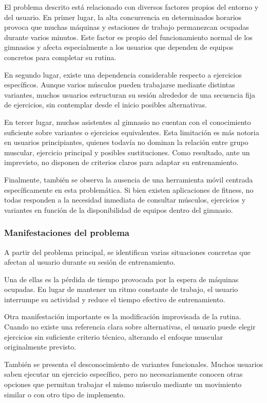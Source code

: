 El problema descrito está relacionado con diversos factores propios del entorno y del usuario. En primer lugar, la alta concurrencia en determinados horarios provoca que muchas máquinas y estaciones de trabajo permanezcan ocupadas durante varios minutos. Este factor es propio del funcionamiento normal de los gimnasios y afecta especialmente a los usuarios que dependen de equipos concretos para completar su rutina.

En segundo lugar, existe una dependencia considerable respecto a ejercicios específicos. Aunque varios músculos pueden trabajarse mediante distintas variantes, muchos usuarios estructuran su sesión alrededor de una secuencia fija de ejercicios, sin contemplar desde el inicio posibles alternativas.

En tercer lugar, muchos asistentes al gimnasio no cuentan con el conocimiento suficiente sobre variantes o ejercicios equivalentes. Esta limitación es más notoria en usuarios principiantes, quienes todavía no dominan la relación entre grupo muscular, ejercicio principal y posibles sustituciones. Como resultado, ante un imprevisto, no disponen de criterios claros para adaptar su entrenamiento.

Finalmente, también se observa la ausencia de una herramienta móvil centrada específicamente en esta problemática. Si bien existen aplicaciones de fitness, no todas responden a la necesidad inmediata de consultar músculos, ejercicios y variantes en función de la disponibilidad de equipos dentro del gimnasio.

\subsubsection{Manifestaciones del problema}

A partir del problema principal, se identifican varias situaciones concretas que afectan al usuario durante su sesión de entrenamiento.

Una de ellas es la pérdida de tiempo provocada por la espera de máquinas ocupadas. En lugar de mantener un ritmo constante de trabajo, el usuario interrumpe su actividad y reduce el tiempo efectivo de entrenamiento.

Otra manifestación importante es la modificación improvisada de la rutina. Cuando no existe una referencia clara sobre alternativas, el usuario puede elegir ejercicios sin suficiente criterio técnico, alterando el enfoque muscular originalmente previsto.

También se presenta el desconocimiento de variantes funcionales. Muchos usuarios saben ejecutar un ejercicio específico, pero no necesariamente conocen otras opciones que permitan trabajar el mismo músculo mediante un movimiento similar o con otro tipo de implemento.

